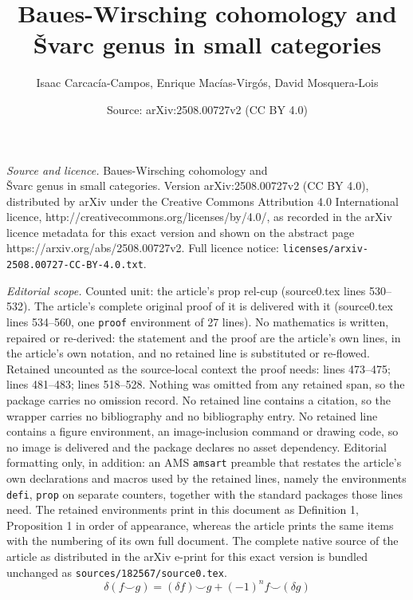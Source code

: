 \documentclass[10pt,a4paper]{amsart}
\title{Baues-Wirsching cohomology and\\ \v{S}varc genus in small categories}
\author{Isaac Carcac\'ia-Campos, Enrique Mac\'ias-Virg\'os, David Mosquera-Lois}
\date{Source: arXiv:2508.00727v2 (CC BY 4.0)}
\begin{document}
\maketitle

\noindent\emph{Source and licence.} Baues-Wirsching cohomology and\\ \v{S}varc genus in small categories. Version arXiv:2508.00727v2 (CC BY 4.0), distributed by arXiv under the Creative Commons Attribution 4.0 International licence, http://creativecommons.org/licenses/by/4.0/, as recorded in the arXiv licence metadata for this exact version and shown on the abstract page https://arxiv.org/abs/2508.00727v2. Full licence notice: \texttt{licenses/arxiv-2508.00727-CC-BY-4.0.txt}.\par\smallskip

\noindent\textit{Editorial scope.} Counted unit: the article's prop rel-cup (source0.tex lines 530--532). The article's complete original proof of it is delivered with it (source0.tex lines 534--560, one \texttt{proof} environment of 27 lines). No mathematics is written, repaired or re-derived: the statement and the proof are the article's own lines, in the article's own notation, and no retained line is substituted or re-flowed.  Retained uncounted as the source-local context the proof needs: lines 473--475; lines 481--483; lines 518--528.  Nothing was omitted from any retained span, so the package carries no omission record.  No retained line contains a citation, so the wrapper carries no bibliography and no bibliography entry.  No retained line contains a figure environment, an image-inclusion command or drawing code, so no image is delivered and the package declares no asset dependency.  Editorial formatting only, in addition: an AMS \texttt{amsart} preamble that restates the article's own declarations and macros used by the retained lines, namely the environments \texttt{defi}, \texttt{prop} on separate counters, together with the standard packages those lines need.  The retained environments print in this document as Definition 1, Proposition 1 in order of appearance, whereas the article prints the same items with the numbering of its own full document.  The complete native source of the article as distributed in the arXiv e-print for this exact version is bundled unchanged as \texttt{sources/182567/source0.tex}.
    \begin{equation}\label{eq:cup_product}
        \delta(f \smile g)= (\delta f) \smile g + (-1)^n f \smile (\delta g)
    \end{equation}
\end{document}
